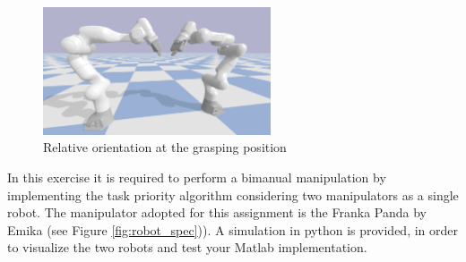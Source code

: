 \documentclass{article}
\begin{document}
\begin{figure}
	\centering
	\includegraphics[width=0.6\textwidth]{grasping_position.png}
	\caption{\label{fig:3}Relative orientation at the grasping position}
\end{figure}

In this exercise it is required to perform a bimanual manipulation by implementing the task priority algorithm considering two manipulators as a single robot. The manipulator adopted for this assignment is the Franka Panda by Emika (see Figure \ref{fig:robot_spec})). A simulation in python is provided, in order to visualize the two robots and test your Matlab implementation.
\end{document}
